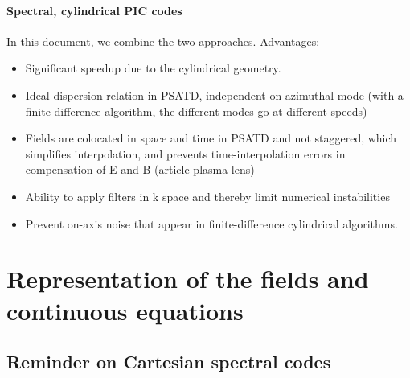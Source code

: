 \documentclass[a4paper]{article}   	%
\begin{document}
\paragraph{Spectral, cylindrical PIC codes } In this document, we combine the two approaches. Advantages:
\begin{itemize}
\item Significant speedup due to the cylindrical geometry.
\item Ideal dispersion relation in PSATD, independent on azimuthal mode (with a finite difference algorithm, the different modes go at different speeds)
\item Fields are colocated in space and time in PSATD and not staggered, which simplifies interpolation, and prevents time-interpolation errors in compensation of E and B (article plasma lens)
\item Ability to apply filters in k space and thereby limit numerical instabilities
\item Prevent on-axis noise that appear in finite-difference cylindrical algorithms.
\end{itemize}


\section{Representation of the fields and continuous equations}

\subsection{Reminder on Cartesian spectral codes}
\end{document}
